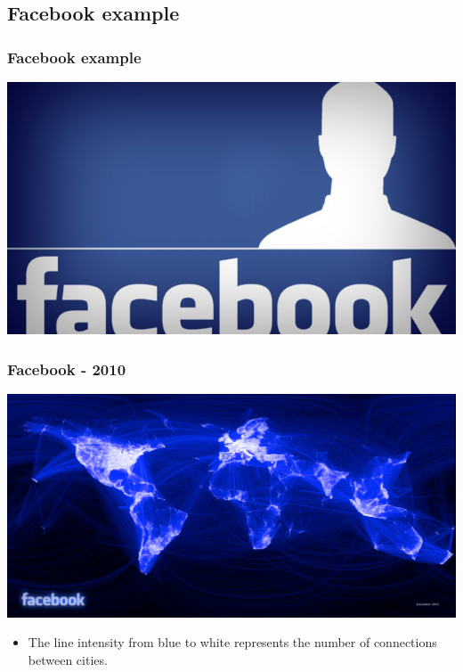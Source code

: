 \documentclass{beamer} %
\newcommand{\1}{\mathbb{1}}
\begin{document}

\subsection[Visualizing data - Facebook]{Facebook example}

\begin{frame}[t]\frametitle{Facebook example}
	\begin{center}
		\includegraphics[scale = 0.3]{./visualization/facebook_logo.jpg}
	\end{center}
\end{frame}
\begin{frame}[t]\frametitle{Facebook - 2010}
	\begin{center}
		\includegraphics[scale = 0.13]{./visualization/facebook.jpg}
	\end{center}
	\begin{itemize}
		\item The line intensity from blue to white represents the number of connections between cities. 
	\end{itemize}
\end{frame}
\end{document}
